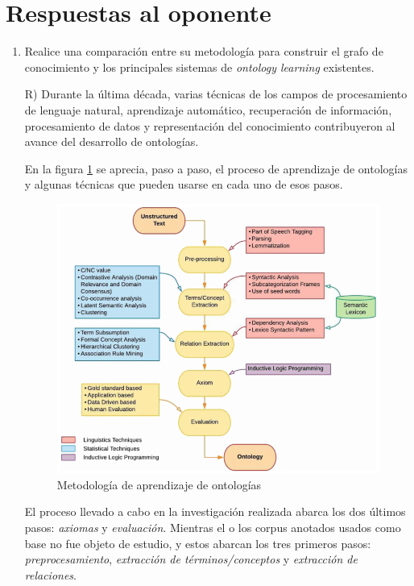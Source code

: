 \documentclass[12pt,oneside]{article}
\begin{document}
	\section{Respuestas al oponente}
	\begin{enumerate}
		\item Realice una comparación entre su metodología para construir el grafo de conocimiento y los principales sistemas de \textit{ontology learning} existentes.

		\item[R)] Durante la última década, varias técnicas de los campos de procesamiento de lenguaje natural, aprendizaje automático, recuperación de información, procesamiento de datos y representación del conocimiento contribuyeron al avance del desarrollo de ontologías.

		En la figura \ref{figure:ontology_learning_methodology}\cite{ref:1} se aprecia, paso a paso, el proceso de aprendizaje de ontologías y algunas técnicas que pueden usarse en cada uno de esos pasos.

		\begin{figure}[h!]
			\includegraphics[width=\linewidth]{graphics/ontology_learning_methodology.png}
			\caption{Metodología de aprendizaje de ontologías}
			\label{figure:ontology_learning_methodology}
		\end{figure}

		El proceso llevado a cabo en la investigación realizada abarca los dos últimos pasos: \textit{axiomas} y \textit{evaluación}. Mientras el o los corpus anotados usados como base no fue objeto de estudio, y estos abarcan los tres primeros pasos: \textit{preprocesamiento}, \textit{extracción de términos/conceptos} y \textit{extracción de relaciones}.


\end{enumerate}
\end{document}
